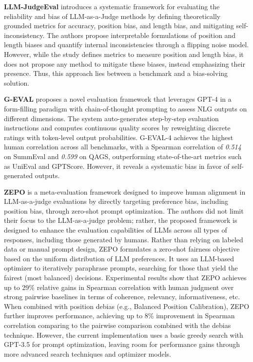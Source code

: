 \documentclass[sigconf, authoryear]{acmart}
\begin{document}
\textbf{LLM-JudgeEval} introduces a systematic framework for evaluating the reliability and bias of LLM-as-a-Judge methods by defining theoretically grounded metrics for accuracy, position bias, and length bias, and mitigating self-inconsistency.
The authors propose interpretable formulations of position and length biases and quantify internal inconsistencies through a flipping noise model.
However, while the study defines metrics to measure position and length bias, it does not propose any method to mitigate these biases, instead emphasizing their presence.
Thus, this approach lies between a benchmark and a bias-solving solution\cite{wei2025systematicevaluationllmasajudgellm}.

\textbf{G-EVAL} proposes a novel evaluation framework that leverages GPT-4 in a form-filling paradigm with chain-of-thought prompting to assess NLG outputs on different dimensions.
The system auto-generates step-by-step evaluation instructions and computes continuous quality scores by reweighting discrete ratings with token-level output probabilities.
G-EVAL-4 achieves the highest human correlation across all benchmarks, with a Spearman correlation of \textit{0.514} on SummEval and \textit{0.599} on QAGS, outperforming state-of-the-art metrics such as UniEval and GPTScore.
However, it reveals a systematic bias in favor of self-generated outputs\cite{liu2023gevalnlgevaluationusing}.

\textbf{ZEPO} is a meta-evaluation framework designed to improve human alignment in LLM-as-a-judge evaluations by directly targeting preference bias, including position bias, through zero-shot prompt optimization.
The authors did not limit their focus to the LLM-as-a-judge problem; rather, the proposed framework is designed to enhance the evaluation capabilities of LLMs across all types of responses, including those generated by humans.
Rather than relying on labeled data or manual prompt design, ZEPO formulates a zero-shot fairness objective based on the uniform distribution of LLM preferences.
It uses an LLM-based optimizer to iteratively paraphrase prompts, searching for those that yield the fairest (most balanced) decisions.
Experimental results show that ZEPO achieves up to 29\% relative gains in Spearman correlation with human judgment over strong pairwise baselines in terms of coherence, relevancy, informativeness, etc.
When combined with position debias (e.g., Balanced Position Calibration\cite{wang2023largelanguagemodelsfair}), ZEPO further improves performance, achieving up to 8\% improvement in Spearman correlation comparing to the pairwise comparison combined with the debias technique.
However, the current implementation uses a basic greedy search with GPT-3.5 for prompt optimization, leaving room for performance gains through more advanced search techniques and optimizer models\cite{zhou2024zepo}.
\end{document}
